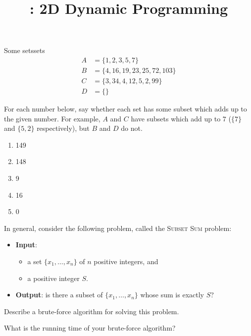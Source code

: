 \documentclass{tufte-handout}
\title{\thecourse: 2D Dynamic Programming}
\date{}
\begin{document}
\maketitle

\begin{model*}{Some sets}{sets}
  \begin{align*}
    A &= \{ 1, 2, 3, 5, 7 \} \\
    B &= \{ 4, 16, 19, 23, 25, 72, 103 \} \\
    C &= \{ 3, 34, 4, 12, 5, 2, 99 \} \\
    D &= \{ \}
  \end{align*}
\end{model*}

\begin{questions}
\item For each number below, say whether each set has some subset
  which adds up to the given number.  For example, $A$ and $C$ have
  subsets which add up to $7$ ($\{7\}$ and $\{5,2\}$ respectively),
  but $B$ and $D$ do not.
  \begin{enumerate}[label=(\alph*)]
  \item 149
  \item 148
  \item 9
  \item 16
  \item 0
  \end{enumerate}
\end{questions}

In general, consider the following problem, called the \textsc{Subset Sum}
problem:
\begin{itemize}
\item \textbf{Input}:
  \begin{itemize}
  \item a set $\{x_1, \dots, x_n\}$ of $n$ positive
    integers, and
  \item a positive integer $S$.
  \end{itemize}

\item \textbf{Output}: is there a subset of $\{x_1, \dots, x_n\}$
  whose sum is exactly $S$?
\end{itemize}

\begin{questions}
\item Describe a brute-force algorithm for solving this problem.
\item \label{q:brute} What is the running time of your brute-force algorithm?
\end{questions}
\end{document}
